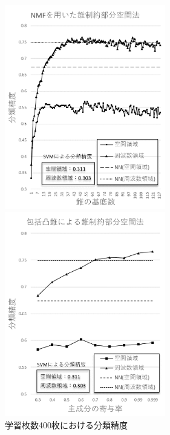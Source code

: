 \begin{figure}[htbp]
	\begin{minipage}{0.5\hsize}
		\begin{center}
			\includegraphics[width=70mm]{result/400-nmf.png}
		\end{center}
	\end{minipage}
	\begin{minipage}{0.5\hsize}
		\begin{center}
			\includegraphics[width=70mm]{result/400-comp.png}
		\end{center}
	\end{minipage}
	\caption{学習枚数400枚における分類精度}
\end{figure}

